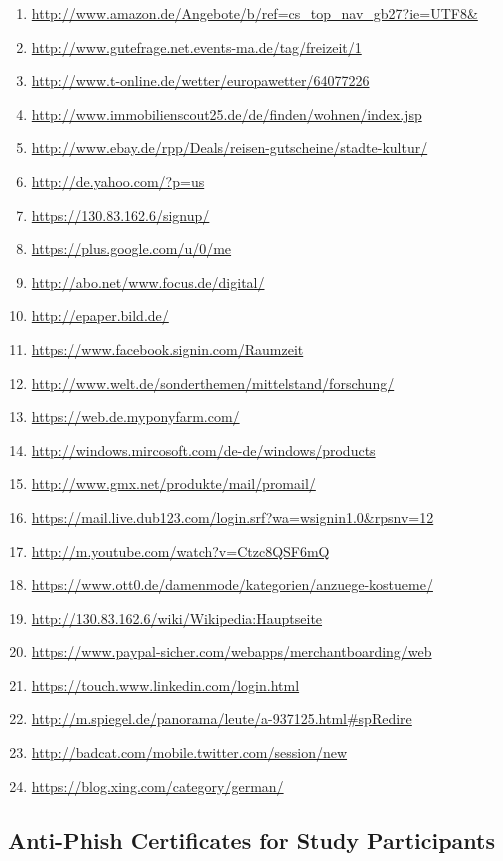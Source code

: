\begin{enumerate}
\item \url{http://www.amazon.de/Angebote/b/ref=cs_top_nav_gb27?ie=UTF8&}
\item \url{http://www.gutefrage.net.events-ma.de/tag/freizeit/1}
\item \url{http://www.t-online.de/wetter/europawetter/64077226}
\item \url{http://www.immobilienscout25.de/de/finden/wohnen/index.jsp}
\item \url{http://www.ebay.de/rpp/Deals/reisen-gutscheine/stadte-kultur/}
\item \url{http://de.yahoo.com/?p=us}
\item \url{https://130.83.162.6/signup/}
\item \url{https://plus.google.com/u/0/me}
\item \url{http://abo.net/www.focus.de/digital/}
\item \url{http://epaper.bild.de/}
\item \url{https://www.facebook.signin.com/Raumzeit}
\item \url{http://www.welt.de/sonderthemen/mittelstand/forschung/}
\item \url{https://web.de.myponyfarm.com/}
\item \url{http://windows.mircosoft.com/de-de/windows/products}
\item \url{http://www.gmx.net/produkte/mail/promail/}
\item \url{https://mail.live.dub123.com/login.srf?wa=wsignin1.0&rpsnv=12}
\item \url{http://m.youtube.com/watch?v=Ctzc8QSF6mQ}
\item \url{https://www.ott0.de/damenmode/kategorien/anzuege-kostueme/}
\item \url{http://130.83.162.6/wiki/Wikipedia:Hauptseite}
\item \url{https://www.paypal-sicher.com/webapps/merchantboarding/web}
\item \url{https://touch.www.linkedin.com/login.html}
\item \url{http://m.spiegel.de/panorama/leute/a-937125.html#spRedire}
\item \url{http://badcat.com/mobile.twitter.com/session/new}
\item \url{https://blog.xing.com/category/german/}
\end{enumerate}


\subsection{Anti-Phish Certificates for Study Participants}
\label{s:antiphish_certs}



